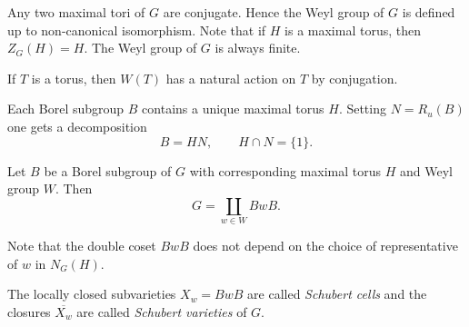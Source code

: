 \documentclass[english, no-theorem-numbers]{short-notes}
\begin{document}
Any two maximal tori of $G$ are conjugate.
Hence the Weyl group of $G$ is defined up to non-canonical isomorphism.
Note that if $H$ is a maximal torus, then $Z_G(H) = H$.
The Weyl group of $G$ is always finite.

If $T$ is a torus, then $W(T)$ has a natural action on $T$ by conjugation.

Each Borel subgroup $B$ contains a unique maximal torus $H$.
Setting $N = R_u(B)$ one gets a decomposition
\[
    B = HN, \qquad H∩N = \{1\}.
\]

\begin{Thm}
    Let $B$ be a Borel subgroup of $G$ with corresponding maximal torus $H$ and Weyl group $W$.
    Then
    \[
        G = \coprod_{w ∈ W} BwB.
    \]
\end{Thm}

Note that the double coset $BwB$ does not depend on the choice of representative of $w$ in $N_G(H)$.

\begin{Def}
    The locally closed subvarieties $X_w = BwB$ are called \emph{Schubert cells} and the closures $\overline{X_w}$ are called \emph{Schubert varieties} of $G$.
\end{Def}

\end{document}
